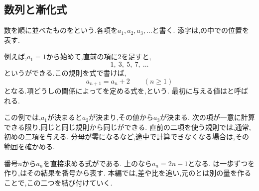 \subsection{数列と漸化式}\label{節：数列と漸化式}
数を順に並べたものをという.各項を$a_1,a_2,a_3,\ldots$と書く.
添字は,の中での位置を表す.

例えば,$a_1=1$から始めて,直前の項に$2$を足すと,
\[
  1,\ 3,\ 5,\ 7,\ \ldots
\]
というができる.この規則を式で書けば,
\[
  a_{n+1}=a_n+2\qquad(n\ge1)
\]
となる.項どうしの関係によってを定める式を,という.
最初に与える値はと呼ばれる.

この例では,$a_1$が決まると$a_2$が決まり,その値から$a_3$が決まる.
次の項が一意に計算できる限り,同じと同じ規則から同じができる.
直前の二項を使う規則では,通常,初めの二項を与える.
分母が零になるなど,途中で計算できなくなる場合は,その範囲を確かめる.

番号$n$から$a_n$を直接求める式がである.
上のなら$a_n=2n-1$となる.
は一歩ずつを作り,はその結果を番号から表す.
本編では,差や比を追い,元のとは別の量を作ることで,この二つを結び付けていく.
